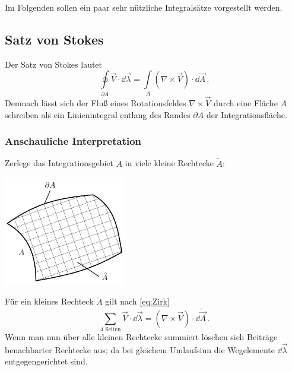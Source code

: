 \documentclass[paper=a4, fontsize=11.0pt, abstractoff, DIV12]{scrartcl}
\begin{document}
Im Folgenden sollen ein paar sehr nützliche Integralsätze vorgestellt werden.

\subsection{Satz von Stokes}

Der Satz von Stokes lautet
\begin{equation}
\oint\limits_{\partial A} \vec V \cdot \dd \vec \lambda = \int\limits_{A} \left(\nabla\times\vec V\right)\cdot \dd \vec A\,.
\end{equation}
Demnach lässt sich der Fluß eines Rotationsfeldes $\nabla \times \vec V$
durch eine Fläche $A$ schreiben als ein Linienintegral entlang des Randes
$\partial A$ der Integrationsfläche.

\subsubsection{Anschauliche Interpretation}

Zerlege das Integrationsgebiet $A$ in viele kleine Rechtecke $\tilde A$:

\begin{center}
    \includegraphics[width=0.4\textwidth]{Figures/Stokes1}
\end{center}
Für ein kleines Rechteck $\tilde A$ gilt nach \eqref{eq:Zirk}
\begin{equation*}
\sum\limits_{\text{4 Seiten}} \vec V \cdot \dd\vec\lambda = \left(\nabla\times\vec V\right)\cdot \dd \tilde{\vec{A}}\, .
\end{equation*}
Wenn man nun über alle kleinen Rechtecke summiert löschen sich Beiträge
benachbarter Rechtecke aus; da bei gleichem Umlaufsinn die Wegelemente
$\dd\vec\lambda$ entgegengerichtet sind.
\end{document}
